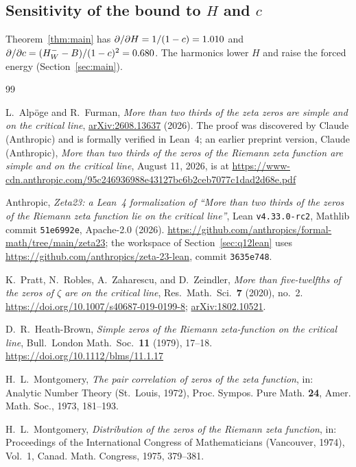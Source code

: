 \documentclass[11pt]{article}
\theoremstyle{definition}
\begin{document}
\subsection{Sensitivity of the bound to \texorpdfstring{$H$ and $c$}{H and c}}
Theorem~\ref{thm:main} has $\partial/\partial H=1/(1-c)=1.010$ and
$\partial/\partial c=(H_W^--B)/(1-c)^2=0.680$. The harmonics lower $H$ and
raise the forced energy (Section~\ref{sec:main}).

\begin{thebibliography}{99}
\small

L.~Alp\"oge and R.~Furman,
\emph{More than two thirds of the zeta zeros are simple and on the critical
line}, \href{https://arxiv.org/abs/2608.13637}{arXiv:2608.13637} (2026). The proof was discovered by Claude (Anthropic)
and is formally verified in Lean~4; an earlier preprint version, Claude
(Anthropic), \emph{More than two thirds of the zeros of the Riemann zeta function
are simple and on the critical line}, August 11, 2026, is at
\url{https://www-cdn.anthropic.com/95c246936988e43127bc6b2ceb7077c1dad2d68e.pdf}

Anthropic, \emph{Zeta23: a Lean~4 formalization of ``More than two thirds of
the zeros of the Riemann zeta function lie on the critical line''}, Lean \texttt{v4.33.0-rc2},
Mathlib commit \texttt{51e6992e}, Apache-2.0 (2026).
\url{https://github.com/anthropics/formal-math/tree/main/zeta23}; the
workspace of Section~\ref{sec:q12lean} uses
\url{https://github.com/anthropics/zeta-23-lean}, commit \texttt{3635e748}.

K.~Pratt, N.~Robles, A.~Zaharescu, and D.~Zeindler,
\emph{More than five-twelfths of the zeros of $\zeta$ are on the critical line},
Res.\ Math.\ Sci.\ \textbf{7} (2020), no.~2.
\url{https://doi.org/10.1007/s40687-019-0199-8}; \href{https://arxiv.org/abs/1802.10521}{arXiv:1802.10521}.

D.~R.~Heath-Brown,
\emph{Simple zeros of the Riemann zeta-function on the critical line},
Bull.\ London Math.\ Soc.\ \textbf{11} (1979), 17--18.
\url{https://doi.org/10.1112/blms/11.1.17}

H.~L.~Montgomery,
\emph{The pair correlation of zeros of the zeta function}, in: Analytic Number
Theory (St.~Louis, 1972), Proc. Sympos. Pure Math. \textbf{24}, Amer. Math.
Soc., 1973, 181--193.

H.~L.~Montgomery,
\emph{Distribution of the zeros of the Riemann zeta function}, in: Proceedings
of the International Congress of Mathematicians (Vancouver, 1974), Vol.~1,
Canad. Math. Congress, 1975, 379--381.


\end{thebibliography}
\end{document}
